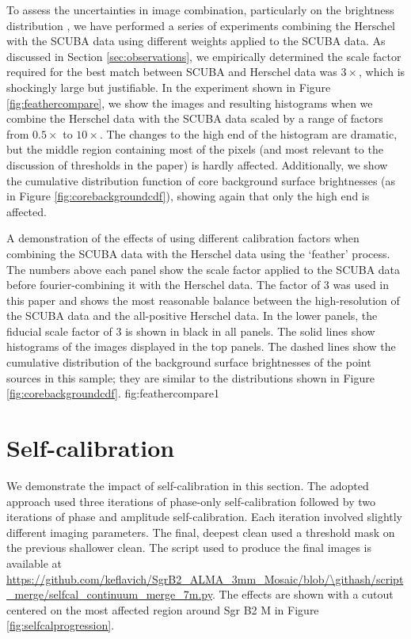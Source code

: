\documentclass[twocolumn]{aastex61}
\begin{document}
To assess the uncertainties in image combination, particularly on the
brightness distribution \citep[e.g.][]{Ossenkopf-Okada2016a}, we have performed
a series of experiments combining the Herschel with the SCUBA data using
different weights applied to the SCUBA data.  As discussed in Section
\ref{sec:observations}, we empirically determined the scale factor required for
the best match between SCUBA and Herschel data was $3\times$, which is
shockingly large but justifiable.  In the experiment shown in Figure
\ref{fig:feathercompare}, we show the images and resulting histograms when we
combine the Herschel data with the SCUBA data scaled by a range of factors from
$0.5\times$ to $10\times$.  The changes to the high end of the histogram are
dramatic, but the middle region containing most of the pixels (and most
relevant to the discussion of thresholds in the paper) is hardly affected.
Additionally, we show the cumulative distribution function of core background
surface brightnesses (as in Figure \ref{fig:corebackgroundcdf}), showing again
that only the high end is affected. 

{A demonstration of the effects of using different calibration factors when
combining the SCUBA data with the Herschel data using the `feather' process.
The numbers above each panel show the scale factor applied to the SCUBA data
before fourier-combining it with the Herschel data.  The factor of 3 was used
in this paper and shows the most reasonable balance between the high-resolution
of the SCUBA data and the all-positive Herschel data.  In the lower panels, the
fiducial scale factor of 3 is shown in black in all panels.  The solid lines
show histograms of the images displayed in the top panels.  The dashed lines
show the cumulative distribution of the background surface brightnesses of the
point sources in this sample; they are similar to the distributions shown in
Figure \ref{fig:corebackgroundcdf}.}
{fig:feathercompare}{1}{\textwidth}

\section{Self-calibration}
\label{sec:selfcal}
We demonstrate the impact of self-calibration in this section.  The adopted approach
used three iterations of phase-only self-calibration followed by two iterations of
phase and amplitude self-calibration.  Each iteration involved slightly
different imaging parameters.  The final, deepest clean used a threshold mask
on the previous shallower clean. The script used to produce the final images is
available at
\url{https://github.com/keflavich/SgrB2_ALMA_3mm_Mosaic/blob/\githash/script_merge/selfcal_continuum_merge_7m.py}.
The effects are shown with a cutout centered on the most affected region around
Sgr B2 M in Figure \ref{fig:selfcalprogression}.
\end{document}
